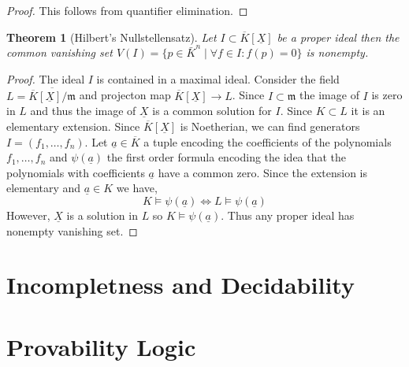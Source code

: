 \documentclass[12pt]{article}
\newcommand{\entails}{\models}
\newcommand{\ul}[1]{\underline{#1}}
\newcommand{\maxideal}{\mathfrak{m}}
\theoremstyle{theorem}
\newtheorem{theorem}{Theorem}[section]
\theoremstyle{definition}
\theoremstyle{definition}
\theoremstyle{remark}
\theoremstyle{definition}
\theoremstyle{remark}
\begin{document}
\begin{proof}
This follows from quantifier elimination.
\end{proof}

\begin{theorem}[Hilbert's Nullstellensatz]
Let $I \subset \overline{K}[\ul{X}]$ be a proper ideal then the common vanishing set $V(I) = \{p \in \bar{K}^n \mid \forall f \in I : f(p) = 0 \}$ is nonempty. 
\end{theorem}

\begin{proof}
The ideal $I$ is contained in a maximal ideal. Consider the field $L = \overline{\overline{K}[\ul{X}] / \maxideal}$ and projecton map $\overline{K}[\ul{X}] \to L$. Since $I \subset \maxideal$ the image of $I$ is zero in $L$ and thus the image of $\ul{X}$ is a common solution for $I$. Since $K \subset L$ it is an elementary extension.
Since $\overline{K}[\ul{X}]$ is Noetherian, we can find generators $I = (f_1, \dots, f_n)$. Let $\ul{a} \in \overline{K}$ a tuple encoding the coefficients of the polynomials $f_1, \dots, f_n$ and $\psi(\ul{a})$ the first order formula encoding the idea that the polynomials with coefficients $\ul{a}$ have a common zero. Since the extension is elementary and $\ul{a} \in K$ we have,
\[ K \entails \psi(\ul{a}) \iff L \entails \psi(\ul{a}) \]
However, $\ul{X}$ is a solution in $L$ so $K \entails \psi(\ul{a})$. Thus any proper ideal has nonempty vanishing set. 
\end{proof}

\section{Incompletness and Decidability}

\section{Provability Logic}
\end{document}
